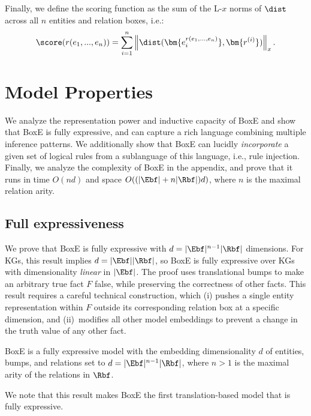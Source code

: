 \documentclass{article}
\begin{document}
Finally, we 
define the scoring function as the sum of the L-$x$ norms of $\dist$ across all $n$ entities and relation boxes, i.e.: 
\[
\score(r(e_1, ..., e_n)) = \sum_{i=1}^{n} \left\Vert \dist(\bm{e_i^{r(e_1, ..., e_n)}}, \bm{r^{(i)}})  \right\Vert_x.
\]

\section{Model Properties}
\label{sec:BoxEProps}
We analyze the representation power and inductive capacity of BoxE and show that BoxE is fully expressive, and can capture a rich language combining multiple inference patterns. We additionally show that BoxE can lucidly \emph{incorporate} a given set of logical rules from a sublanguage of this language, i.e., rule injection. Finally, we analyze the complexity of BoxE in the appendix, and prove that it runs in time $O(nd)$ and space $O((|\Ebf| + n|\Rbf|)d)$, where $n$ is the maximal relation arity. 

\subsection{Full expressiveness}
We prove that BoxE is fully expressive with $d = |\Ebf|^{n-1}|\Rbf|$ dimensions. For KGs, this result implies $d = |\Ebf||\Rbf|$, so BoxE is fully expressive over KGs with dimensionality \emph{linear} in $|\Ebf|$. The proof uses translational bumps to make an arbitrary true fact $F$ false, while preserving the correctness of other facts. This result requires a careful technical construction, which (i) pushes a single entity representation within $F$ outside its corresponding relation box at a specific dimension, and (ii)~modifies all other model embeddings to prevent a change in the truth value of any other fact.  


\begin{theorem}
\label{thm:fullexp}
BoxE is a fully expressive model with the embedding dimensionality $d$ of entities, bumps, and relations set to $d = |\Ebf|^{n-1}|\Rbf|$, where $n>1$ is the maximal arity of the relations in $\Rbf$.
\end{theorem}
We note that this result makes BoxE the first translation-based model that is fully expressive. 


\iffalse
\begin{proof}[Proof Sketch]
The theorem is proven by induction, by starting with the all-true KG, which is trivially expressible, and subsequently proving that BoxE with $d = |\Ebf||\Rbf|$ dimensions can make any fact $r_i(e_j, e_k), i \in \Rbf, j,k \in \Ebf\}$ false without affecting any of the remaining facts in G. This is done through bumping the entity at position 2 (tail) at dimension $i|\Ebf| + j$ so that it exits the corresponding position box, and then applying a series of parallel changes along the same dimension in entity and relation embeddings, to preserve the state of all other KG facts. Thus, since any fact can be independently made false, any configuration of G is expressible by BoxE with $d = |\Ebf||\Rbf|$ dimensions, and BoxE is fully expressive. 
\end{proof}
\fi 
\end{document}
